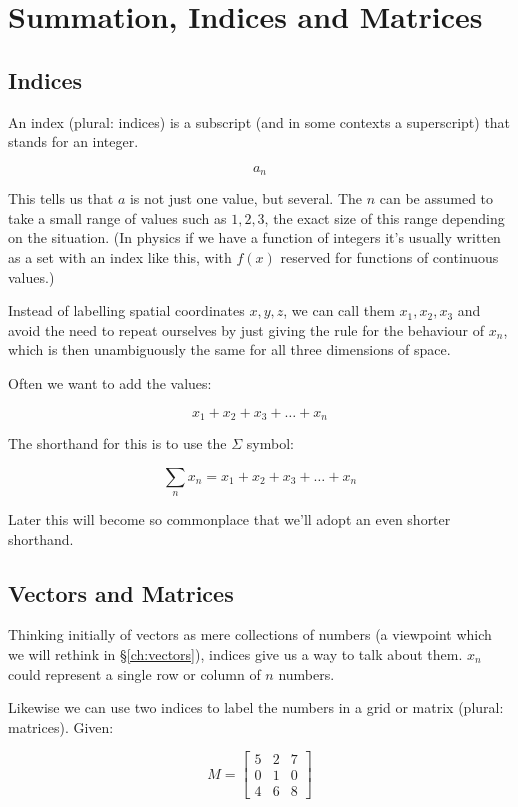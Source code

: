 \chapter{Summation, Indices and Matrices}

\section{Indices}

An index (plural: indices) is a subscript (and in some contexts a superscript) that stands for an integer.

$$a_n$$

This tells us that $a$ is not just one value, but several. The $n$ can be assumed to take a small range of values such as $1, 2, 3$, the exact size of this range depending on the situation. (In physics if we have a function of integers it's usually written as a set with an index like this, with $f(x)$ reserved for functions of continuous values.)

Instead of labelling spatial coordinates $x, y, z$, we can call them $x_1, x_2, x_3$ and avoid the need to repeat ourselves by just giving the rule for the behaviour of $x_n$, which is then unambiguously the same for all three dimensions of space.

Often we want to add the values:

$$x_1 + x_2 + x_3 + \dots + x_n$$

The shorthand for this is to use the $\Sigma$ symbol:

$$\sum_n{x_n} = x_1 + x_2 + x_3 + \dots + x_n$$

Later this will become so commonplace that we'll adopt an even shorter shorthand.

\section{Vectors and Matrices}

Thinking initially of vectors as mere collections of numbers (a viewpoint which we will rethink in §\ref{ch:vectors}), indices give us a way to talk about them. $x_n$ could represent a single row or column of $n$ numbers.

Likewise we can use two indices to label the numbers in a grid or matrix (plural: matrices). Given:

$$
M = \begin{bmatrix}
5 & 2 & 7 \\
0 & 1 & 0 \\
4 & 6 & 8
\end{bmatrix}
$$

